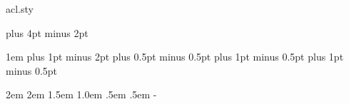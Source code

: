 \begin{filecontents*}{acl.sty}
\def\section{\@startsection {section}{1}{\z@}{-2.0ex plus
    -0.5ex minus -.2ex}{1.5ex plus 0.3ex minus .2ex}{\large\bfseries\raggedright}}
\def\subsection{\@startsection{subsection}{2}{\z@}{-1.8ex plus
    -0.5ex minus -.2ex}{0.8ex plus .2ex}{\normalsize\bfseries\raggedright}}
\def\subsubsection{\@startsection{subsubsection}{3}{\z@}{-1.5ex plus
   -0.5ex minus -.2ex}{0.5ex plus .2ex}{\normalsize\bfseries\raggedright}}
\def\paragraph{\@startsection{paragraph}{4}{\z@}{1.5ex plus
   0.5ex minus .2ex}{-1em}{\normalsize\bfseries}}
\def\subparagraph{\@startsection{subparagraph}{5}{\parindent}{1.5ex plus
   0.5ex minus .2ex}{-1em}{\normalsize\bfseries}}

\footnotesep 6.65pt %
\skip\footins 9pt plus 4pt minus 2pt
\def\footnoterule{\kern-3pt \hrule width 5pc \kern 2.6pt }
\setcounter{footnote}{0}

\parindent 1em
\topsep 4pt plus 1pt minus 2pt
\partopsep 1pt plus 0.5pt minus 0.5pt
\itemsep 2pt plus 1pt minus 0.5pt
\parsep 2pt plus 1pt minus 0.5pt

\leftmargin 2em \leftmargini\leftmargin \leftmarginii 2em
\leftmarginiii 1.5em \leftmarginiv 1.0em \leftmarginv .5em \leftmarginvi .5em
\leftmargini\advance{}- {}

\def\@listi{\leftmargin\leftmargini}
\def\@listii{\leftmargin\leftmarginii
   \labelwidth\leftmarginii\advance\labelwidth-\labelsep
   \topsep 2pt plus 1pt minus 0.5pt
   \parsep 1pt plus 0.5pt minus 0.5pt
   \itemsep \parsep}
\def\@listiii{\leftmargin\leftmarginiii
    \labelwidth\leftmarginiii\advance\labelwidth-\labelsep
    \topsep 1pt plus 0.5pt minus 0.5pt
    \parsep \z@ \partopsep 0.5pt plus 0pt minus 0.5pt
    \itemsep \topsep}
\def\@listiv{\leftmargin\leftmarginiv
     \labelwidth\leftmarginiv\advance\labelwidth-\labelsep}
\def\@listv{\leftmargin\leftmarginv
     \labelwidth\leftmarginv\advance\labelwidth-\labelsep}
\def\@listvi{\leftmargin\leftmarginvi
     \labelwidth\leftmarginvi\advance\labelwidth-\labelsep}


\end{filecontents*}
